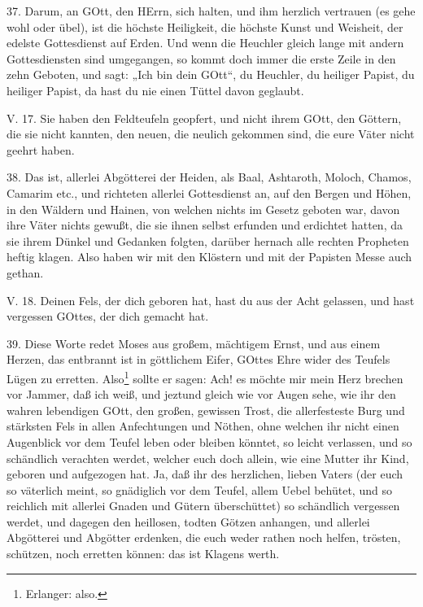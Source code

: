 37. Darum, an GOtt, den HErrn, sich halten, und ihm herzlich vertrauen (es gehe wohl oder übel), ist die höchste Heiligkeit, die höchste Kunst und Weisheit, der edelste Gottesdienst auf Erden. Und wenn die Heuchler gleich lange mit andern Gottesdiensten sind umgegangen, so kommt doch immer die erste Zeile in den zehn Geboten, und sagt: „Ich bin dein GOtt“, du Heuchler, du heiliger Papist, du heiliger Papist, da hast du nie einen Tüttel davon geglaubt.

\begin{schriftzitat}
V. 17. Sie haben den Feldteufeln geopfert, und nicht ihrem GOtt, den Göttern, die sie nicht kannten, den neuen, die neulich gekommen sind, die eure Väter nicht geehrt haben.
\end{schriftzitat}

38. Das ist, allerlei Abgötterei der Heiden, als Baal, Ashtaroth, Moloch, Chamos, Camarim etc., und richteten allerlei Gottesdienst an,
auf den Bergen und Höhen, in den Wäldern und Hainen, von welchen nichts im Gesetz geboten war, davon ihre Väter nichts gewußt, die sie ihnen selbst erfunden und erdichtet hatten, da sie ihrem Dünkel und Gedanken folgten, darüber hernach alle rechten Propheten heftig klagen. Also haben wir mit den Klöstern und mit der Papisten Messe auch gethan.

\begin{schriftzitat}
V. 18. Deinen Fels, der dich geboren hat, hast du aus der Acht gelassen, und hast vergessen GOttes, der dich gemacht hat.
\end{schriftzitat}

39. Diese Worte redet Moses aus großem, mächtigem Ernst, und aus einem Herzen, das entbrannt ist in göttlichem Eifer, GOttes Ehre wider des Teufels Lügen zu erretten. Also\footnote{Erlanger: also.} sollte er sagen: Ach! es möchte mir mein Herz brechen vor Jammer, daß ich weiß, und jeztund gleich wie vor Augen sehe, wie ihr den wahren lebendigen GOtt, den großen, gewissen Trost, die allerfesteste Burg und stärksten Fels in allen Anfechtungen und Nöthen, ohne welchen ihr nicht einen Augenblick vor dem Teufel leben oder bleiben könntet, so leicht verlassen, und so schändlich verachten werdet, welcher euch doch allein, wie eine Mutter ihr Kind, geboren und aufgezogen hat. Ja, daß ihr des herzlichen, lieben Vaters (der euch so väterlich meint, so gnädiglich vor dem Teufel, allem Uebel behütet, und so reichlich mit allerlei Gnaden und Gütern überschüttet) so schändlich vergessen werdet, und dagegen den heillosen, todten Götzen anhangen, und allerlei Abgötterei und Abgötter erdenken, die euch weder rathen noch helfen, trösten, schützen, noch erretten können: das ist Klagens werth.

